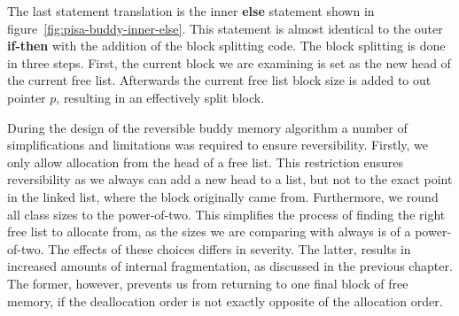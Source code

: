 The last statement translation is the inner \textbf{else} statement shown in figure~\ref{fig:pisa-buddy-inner-else}. This statement is almost identical to the outer \textbf{if-then} with the addition of the block splitting code. The block splitting is done in three steps. First, the current block we are examining is set as the new head of the current free list. Afterwards the current free list block size is added to out pointer $p$, resulting in an effectively split block.

During the design of the reversible buddy memory algorithm a number of simplifications and limitations was required to ensure reversibility. Firstly, we only allow allocation from the head of a free list. This restriction ensures reversibility as we always can add a new head to a list, but not to the exact point in the linked list, where the block originally came from. Furthermore, we round all class sizes to the power-of-two. This simplifies the process of finding the right free list to allocate from, as the sizes we are comparing with always is of a power-of-two. The effects of these choices differs in severity. The latter, results in increased amounts of internal fragmentation, as discussed in the previous chapter. The former, however, prevents us from returning to one final block of free memory, if the deallocation order is not exactly opposite of the allocation order.

